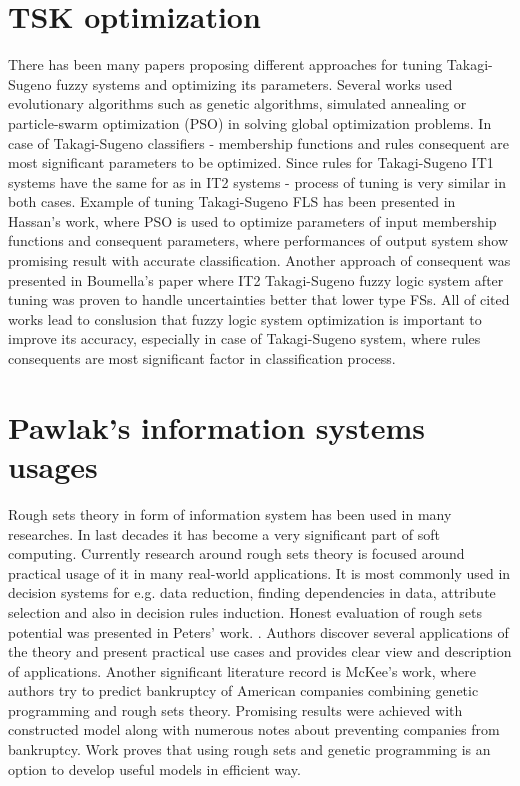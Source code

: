 \documentclass[english,masters]{wizthesis}
\begin{document}
{\section{TSK optimization}
There has been many papers proposing different approaches for tuning Takagi-Sugeno fuzzy systems and optimizing its parameters. Several works used evolutionary algorithms such as genetic algorithms\cite{Enwang}, simulated annealing or particle-swarm optimization (PSO)\cite{Elragal14} in solving global optimization problems.
In case of Takagi-Sugeno classifiers - membership functions and rules consequent are most significant parameters to be optimized. Since rules for Takagi-Sugeno IT1 systems have the same for as in IT2 systems - process of tuning is very similar in both cases. Example of tuning Takagi-Sugeno FLS has been presented in Hassan's work\cite{hassan}, where PSO is used to optimize parameters of input membership functions and consequent parameters, where performances of output system show promising result with accurate classification. Another approach of consequent was presented in Boumella's paper \cite{Boumella} where IT2 Takagi-Sugeno fuzzy logic system after tuning was proven to handle uncertainties better that lower type FSs.
All of cited works lead to conslusion that fuzzy logic system optimization is important to improve its accuracy, especially in case of Takagi-Sugeno system, where rules consequents are most significant factor in classification process. 

} 
\section{Pawlak's information systems usages}
Rough sets theory in form of information system has been used in many researches. In last decades it has become a very significant part of soft computing. Currently research around rough sets theory is focused around practical usage of it in many real-world applications. It is most commonly used in decision systems for e.g. data reduction, finding dependencies in data, attribute selection and also in decision rules induction. Honest evaluation of rough sets potential was presented in Peters' work. \cite{Peters2012RoughSS}.
Authors discover several applications of the theory and present practical use cases and provides clear view and description of applications.
Another significant literature record is McKee's work\cite{MCKEE}, where authors try to predict bankruptcy of American companies combining genetic programming and rough sets theory. Promising results were achieved with constructed model along with numerous notes about preventing companies from bankruptcy. Work proves that using rough sets and genetic programming is an option to develop useful models in efficient way.
\end{document}
